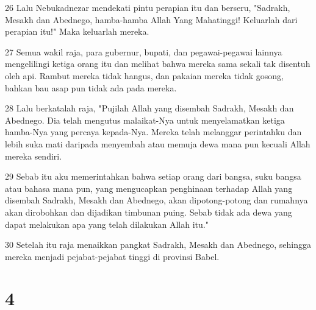 \par 26 Lalu Nebukadnezar mendekati pintu perapian itu dan berseru, "Sadrakh, Mesakh dan Abednego, hamba-hamba Allah Yang Mahatinggi! Keluarlah dari perapian itu!" Maka keluarlah mereka.
\par 27 Semua wakil raja, para gubernur, bupati, dan pegawai-pegawai lainnya mengelilingi ketiga orang itu dan melihat bahwa mereka sama sekali tak disentuh oleh api. Rambut mereka tidak hangus, dan pakaian mereka tidak gosong, bahkan bau asap pun tidak ada pada mereka.
\par 28 Lalu berkatalah raja, "Pujilah Allah yang disembah Sadrakh, Mesakh dan Abednego. Dia telah mengutus malaikat-Nya untuk menyelamatkan ketiga hamba-Nya yang percaya kepada-Nya. Mereka telah melanggar perintahku dan lebih suka mati daripada menyembah atau memuja dewa mana pun kecuali Allah mereka sendiri.
\par 29 Sebab itu aku memerintahkan bahwa setiap orang dari bangsa, suku bangsa atau bahasa mana pun, yang mengucapkan penghinaan terhadap Allah yang disembah Sadrakh, Mesakh dan Abednego, akan dipotong-potong dan rumahnya akan dirobohkan dan dijadikan timbunan puing. Sebab tidak ada dewa yang dapat melakukan apa yang telah dilakukan Allah itu."
\par 30 Setelah itu raja menaikkan pangkat Sadrakh, Mesakh dan Abednego, sehingga mereka menjadi pejabat-pejabat tinggi di provinsi Babel.

\chapter{4}

